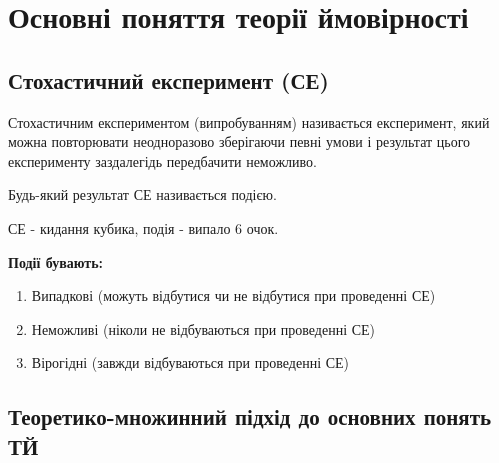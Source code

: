 
\section{Основні поняття теорії ймовірності}
\subsection*{Стохастичний експеримент (СЕ)}
\begin{definition}
    Стохастичним експериментом (випробуванням) називається експеримент, 
    який можна повторювати неодноразово зберігаючи певні умови і результат цього 
    експерименту заздалегідь передбачити неможливо.
\end{definition}
\begin{definition}
    Будь-який результат СЕ називається подією.
\end{definition}
\begin{example}
    СЕ - кидання кубика, подія - випало 6 очок.
\end{example}

\textbf{Події бувають:}
\begin{enumerate}
    \item Випадкові (можуть відбутися чи не відбутися при проведенні СЕ)
    \item Неможливі (ніколи не відбуваються при проведенні СЕ)
    \item Вірогідні (завжди відбуваються при проведенні СЕ)
\end{enumerate}
\subsection*{Теоретико-множинний підхід до основних понять ТЙ}